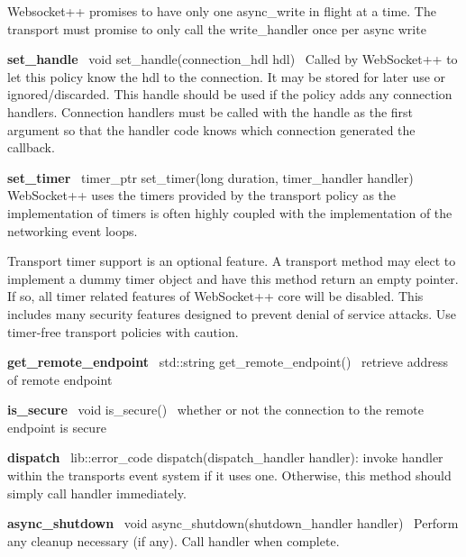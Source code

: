 Websocket++ promises to have only one async\+\_\+write in flight at a time. The transport must promise to only call the write\+\_\+handler once per async write

{\bfseries set\+\_\+handle}~\newline
{\ttfamily void set\+\_\+handle(connection\+\_\+hdl hdl)}~\newline
Called by Web\+Socket++ to let this policy know the hdl to the connection. It may be stored for later use or ignored/discarded. This handle should be used if the policy adds any connection handlers. Connection handlers must be called with the handle as the first argument so that the handler code knows which connection generated the callback.

{\bfseries set\+\_\+timer}~\newline
{\ttfamily timer\+\_\+ptr set\+\_\+timer(long duration, timer\+\_\+handler handler)}~\newline
Web\+Socket++ uses the timers provided by the transport policy as the implementation of timers is often highly coupled with the implementation of the networking event loops.

Transport timer support is an optional feature. A transport method may elect to implement a dummy timer object and have this method return an empty pointer. If so, all timer related features of Web\+Socket++ core will be disabled. This includes many security features designed to prevent denial of service attacks. Use timer-\/free transport policies with caution.

{\bfseries get\+\_\+remote\+\_\+endpoint}~\newline
{\ttfamily std\+::string get\+\_\+remote\+\_\+endpoint()}~\newline
retrieve address of remote endpoint

{\bfseries is\+\_\+secure}~\newline
{\ttfamily void is\+\_\+secure()}~\newline
whether or not the connection to the remote endpoint is secure

{\bfseries dispatch}~\newline
{\ttfamily lib\+::error\+\_\+code dispatch(dispatch\+\_\+handler handler)}\+: invoke handler within the transport\textquotesingle{}s event system if it uses one. Otherwise, this method should simply call {\ttfamily handler} immediately.

{\bfseries async\+\_\+shutdown}~\newline
{\ttfamily void async\+\_\+shutdown(shutdown\+\_\+handler handler)}~\newline
Perform any cleanup necessary (if any). Call {\ttfamily handler} when complete.


